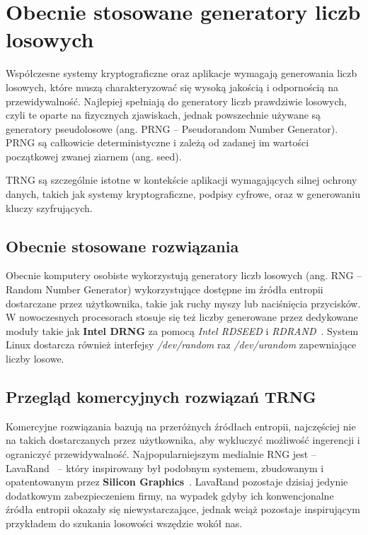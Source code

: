 \chapter{Obecnie stosowane generatory liczb losowych}\label{ch:przeglad-rynku}

Współczesne systemy kryptograficzne oraz aplikacje wymagają generowania liczb losowych,
które muszą charakteryzować się wysoką jakością i odpornością na przewidywalność.
Najlepiej spełniają do generatory liczb prawdziwie losowych, czyli te oparte na fizycznych zjawiskach,
jednak powszechnie używane są generatory pseudolosowe (ang. PRNG -- Pseudorandom Number Generator).
PRNG są całkowicie deterministyczne i zależą od zadanej im wartości początkowej zwanej ziarnem (ang. seed).

TRNG są szczególnie istotne w kontekście aplikacji wymagających silnej ochrony danych,
takich jak systemy kryptograficzne, podpisy cyfrowe, oraz w generowaniu kluczy szyfrujących.

\section{Obecnie stosowane rozwiązania}\label{sec:obecnie-stosowane-rozwiazania}

Obecnie komputery osobiste wykorzystują generatory liczb losowych (ang. RNG -- Random Number Generator)
wykorzystujące dostępne im źródła entropii dostarczane przez użytkownika, takie jak ruchy myszy lub naciśnięcia przycisków.
W nowoczesnych procesorach stosuje się też liczby generowane przez dedykowane moduły takie jak \textbf{Intel DRNG} za pomocą \textit{Intel RDSEED} i \textit{RDRAND}~\cite{IntelRD}.
System Linux dostarcza również interfejsy \textit{/dev/random} raz \textit{/dev/urandom} zapewniające liczby losowe.

\section{Przegląd komercyjnych rozwiązań TRNG}\label{sec:przeglad-komercyjnych-rozwiazan-trng}

Komercyjne rozwiązania bazują na przeróżnych źródłach entropii,
najczęściej nie na takich dostarczanych przez użytkownika, aby wykluczyć możliwość ingerencji i ograniczyć przewidywalność.
Najpopularniejszym medialnie RNG jest -- LavaRand~\cite{cloudflare_lavarand} -- który inspirowany był podobnym systemem,
zbudowanym i opatentowanym przez \textbf{Silicon Graphics}~\cite{SiliconGraphics}.
LavaRand pozostaje dzisiaj jedynie dodatkowym zabezpieczeniem firmy,
na wypadek gdyby ich konwencjonalne źródła entropii okazały się niewystarczające,
jednak wciąż pozostaje inspirującym przykładem do szukania losowości wszędzie wokół nas.


